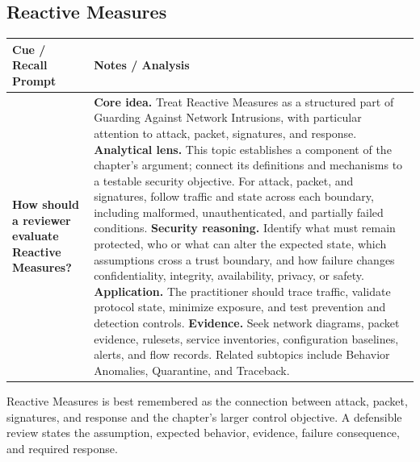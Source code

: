 \documentclass[11pt]{article}
\newcommand{\CornellHeader}{%
\rowcolor{Navy}\color{white}\bfseries Cue / Recall Prompt & \color{white}\bfseries Notes / Analysis\\\hline}
\newcommand{\CornellRow}[2]{%
\cellcolor{CueGray}\RaggedRight\textbf{#1} & \RaggedRight #2\\\hline}
\begin{document}
\subsection*{Reactive Measures}
\begin{longtable}{>{\RaggedRight\arraybackslash}p{}|>{\RaggedRight\arraybackslash}p{}}
\CornellHeader
\CornellRow{How should a reviewer evaluate Reactive Measures?}{\textbf{Core idea.} Treat Reactive Measures as a structured part of Guarding Against Network Intrusions, with particular attention to attack, packet, signatures, and response. \textbf{Analytical lens.} This topic establishes a component of the chapter's argument; connect its definitions and mechanisms to a testable security objective. For attack, packet, and signatures, follow traffic and state across each boundary, including malformed, unauthenticated, and partially failed conditions. \textbf{Security reasoning.} Identify what must remain protected, who or what can alter the expected state, which assumptions cross a trust boundary, and how failure changes confidentiality, integrity, availability, privacy, or safety. \textbf{Application.} The practitioner should trace traffic, validate protocol state, minimize exposure, and test prevention and detection controls. \textbf{Evidence.} Seek network diagrams, packet evidence, rulesets, service inventories, configuration baselines, alerts, and flow records. Related subtopics include Behavior Anomalies, Quarantine, and Traceback.}
\end{longtable}
\begin{topicsummary}
Reactive Measures is best remembered as the connection between attack, packet, signatures, and response and the chapter's larger control objective. A defensible review states the assumption, expected behavior, evidence, failure consequence, and required response.
\end{topicsummary}
\end{document}
